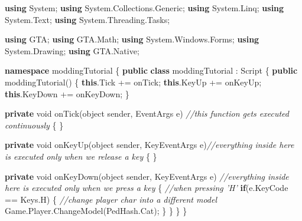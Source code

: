 \documentclass[
  openany]{book}
\newenvironment{Shaded}{\begin{snugshade}}{\end{snugshade}}
\newcommand{\CommentTok}[1]{\textcolor[rgb]{0.56,0.35,0.01}{\textit{#1}}}
\newcommand{\DataTypeTok}[1]{\textcolor[rgb]{0.13,0.29,0.53}{#1}}
\newcommand{\FunctionTok}[1]{\textcolor[rgb]{0.00,0.00,0.00}{#1}}
\newcommand{\KeywordTok}[1]{\textcolor[rgb]{0.13,0.29,0.53}{\textbf{#1}}}
\newcommand{\NormalTok}[1]{#1}
\begin{document}
\begin{Shaded}
\begin{Highlighting}[]
\KeywordTok{using}\NormalTok{ System;}
\KeywordTok{using}\NormalTok{ System.}\FunctionTok{Collections}\NormalTok{.}\FunctionTok{Generic}\NormalTok{;}
\KeywordTok{using}\NormalTok{ System.}\FunctionTok{Linq}\NormalTok{;}
\KeywordTok{using}\NormalTok{ System.}\FunctionTok{Text}\NormalTok{;}
\KeywordTok{using}\NormalTok{ System.}\FunctionTok{Threading}\NormalTok{.}\FunctionTok{Tasks}\NormalTok{;}
 
\KeywordTok{using}\NormalTok{ GTA;}
\KeywordTok{using}\NormalTok{ GTA.}\FunctionTok{Math}\NormalTok{;}
\KeywordTok{using}\NormalTok{ System.}\FunctionTok{Windows}\NormalTok{.}\FunctionTok{Forms}\NormalTok{;}
\KeywordTok{using}\NormalTok{ System.}\FunctionTok{Drawing}\NormalTok{;}
\KeywordTok{using}\NormalTok{ GTA.}\FunctionTok{Native}\NormalTok{;}
 
 
\KeywordTok{namespace}\NormalTok{ moddingTutorial}
\NormalTok{\{}
    \KeywordTok{public} \KeywordTok{class}\NormalTok{ moddingTutorial : Script}
\NormalTok{    \{}
        \KeywordTok{public} \FunctionTok{moddingTutorial}\NormalTok{()}
\NormalTok{        \{}
            \KeywordTok{this}\NormalTok{.}\FunctionTok{Tick}\NormalTok{ += onTick;}
            \KeywordTok{this}\NormalTok{.}\FunctionTok{KeyUp}\NormalTok{ += onKeyUp;}
            \KeywordTok{this}\NormalTok{.}\FunctionTok{KeyDown}\NormalTok{ += onKeyDown;}
\NormalTok{        \}}
 
        \KeywordTok{private} \DataTypeTok{void} \FunctionTok{onTick}\NormalTok{(}\DataTypeTok{object}\NormalTok{ sender, EventArgs e) }\CommentTok{//this function gets executed continuously }
\NormalTok{        \{}
\NormalTok{        \}}
 
        \KeywordTok{private} \DataTypeTok{void} \FunctionTok{onKeyUp}\NormalTok{(}\DataTypeTok{object}\NormalTok{ sender, KeyEventArgs e)}\CommentTok{//everything inside here is executed only when we release a key}
\NormalTok{        \{}
\NormalTok{        \}}
 
        \KeywordTok{private} \DataTypeTok{void} \FunctionTok{onKeyDown}\NormalTok{(}\DataTypeTok{object}\NormalTok{ sender, KeyEventArgs e) }\CommentTok{//everything inside here is executed only when we press a key}
\NormalTok{        \{}
            \CommentTok{//when pressing 'H'}
            \KeywordTok{if}\NormalTok{(e.}\FunctionTok{KeyCode}\NormalTok{ == Keys.}\FunctionTok{H}\NormalTok{)}
\NormalTok{            \{}
                \CommentTok{//change player char into a different model}
\NormalTok{                Game.}\FunctionTok{Player}\NormalTok{.}\FunctionTok{ChangeModel}\NormalTok{(PedHash.}\FunctionTok{Cat}\NormalTok{); }
\NormalTok{            \}}
\NormalTok{        \}}
\NormalTok{    \}}
\NormalTok{\}}
\end{Highlighting}
\end{Shaded}
\end{document}
